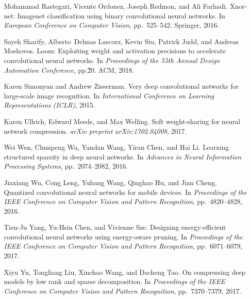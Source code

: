 \documentclass{article} %
\begin{document}
\begin{thebibliography}{36}
Mohammad Rastegari, Vicente Ordonez, Joseph Redmon, and Ali Farhadi.
\newblock Xnor-net: Imagenet classification using binary convolutional neural
  networks.
\newblock In \emph{European Conference on Computer Vision}, pp.\ 525--542.
  Springer, 2016.

Sayeh Sharify, Alberto~Delmas Lascorz, Kevin Siu, Patrick Judd, and Andreas
  Moshovos.
\newblock Loom: Exploiting weight and activation precisions to accelerate
  convolutional neural networks.
\newblock In \emph{Proceedings of the 55th Annual Design Automation
  Conference}, pp.\~20. ACM, 2018.

Karen Simonyan and Andrew Zisserman.
\newblock Very deep convolutional networks for large-scale image recognition.
\newblock In \emph{International Conference on Learning Representations
  (ICLR)}, 2015.

Karen Ullrich, Edward Meeds, and Max Welling.
\newblock Soft weight-sharing for neural network compression.
\newblock \emph{arXiv preprint arXiv:1702.04008}, 2017.

Wei Wen, Chunpeng Wu, Yandan Wang, Yiran Chen, and Hai Li.
\newblock Learning structured sparsity in deep neural networks.
\newblock In \emph{Advances in Neural Information Processing Systems}, pp.\  2074--2082, 2016.

Jiaxiang Wu, Cong Leng, Yuhang Wang, Qinghao Hu, and Jian Cheng.
\newblock Quantized convolutional neural networks for mobile devices.
\newblock In \emph{Proceedings of the IEEE Conference on Computer Vision and
  Pattern Recognition}, pp.\ 4820--4828, 2016.

Tien-Ju Yang, Yu-Hsin Chen, and Vivienne Sze.
\newblock Designing energy-efficient convolutional neural networks using
  energy-aware pruning.
\newblock In \emph{Proceedings of the IEEE Conference on Computer Vision and
  Pattern Recognition}, pp.\ 6071--6079, 2017.

Xiyu Yu, Tongliang Liu, Xinchao Wang, and Dacheng Tao.
\newblock On compressing deep models by low rank and sparse decomposition.
\newblock In \emph{Proceedings of the IEEE Conference on Computer Vision and
  Pattern Recognition}, pp.\ 7370--7379, 2017.


\end{thebibliography}
\end{document}
